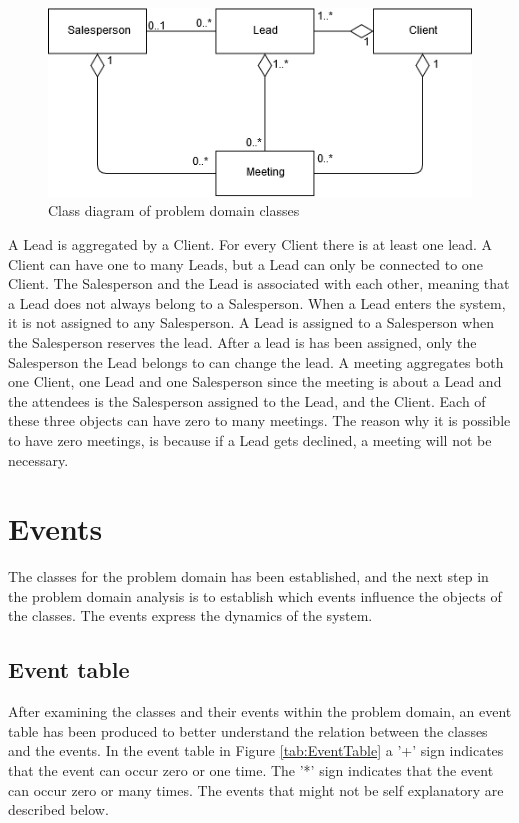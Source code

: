 \begin{figure}[H]
    \centering
    \includegraphics[scale=0.7, clip]{figures/ClassDiagrams/ProblemDomain.png}
    \caption{Class diagram of problem domain classes}
    \label{fig:ClassOverview}
\end{figure}
\noindent
A Lead is aggregated by a Client. For every Client there is at least one lead. A Client can have one to many Leads, but a Lead can only be connected to one Client. The Salesperson and the Lead is associated with each other, meaning that a Lead does not always belong to a Salesperson. When a Lead enters the system, it is not assigned to any Salesperson. A Lead is assigned to a Salesperson when the Salesperson reserves the lead. After a lead is has been assigned, only the Salesperson the Lead belongs to can change the lead. A meeting aggregates both one Client, one Lead and one Salesperson since the meeting is about a Lead and the attendees is the Salesperson assigned to the Lead, and the Client. Each of these three objects can have zero to many meetings. The reason why it is possible to have zero meetings, is because if a Lead gets declined, a meeting will not be necessary. 


\section{Events}
The classes for the problem domain has been established, and the next step in the problem domain analysis is to establish which events influence the objects of the classes. The events express the dynamics of the system.

\subsection{Event table}
After examining the classes and their events within the problem domain, an event table has been produced to better understand the relation between the classes and the events. In the event table in Figure \ref{tab:EventTable} a '+' sign indicates that the event can occur zero or one time. The '*' sign indicates that the event can occur zero or many times. The events that might not be self explanatory are described below.

